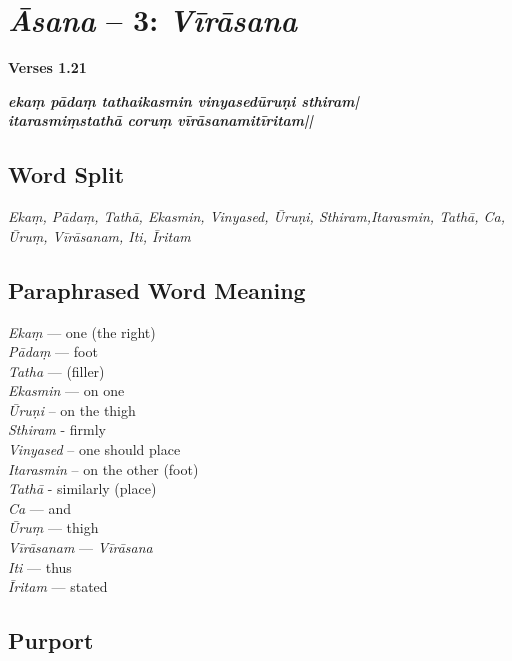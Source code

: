 \section*{\textit{Āsana} -- 3: \textit{Vīrāsana}}

\noindent \textbf{Verses 1.21}

\begin{shloka}
\textit{\textbf{ekaṃ pādaṃ tathaikasmin vinyasedūruṇi sthiram|}\\
\textbf{itarasmiṃstathā coruṃ vīrāsanamitīritam||}}
\end{shloka}

\subsection*{Word Split}

\textit{Ekaṃ, Pādaṃ,  Tathā, Ekasmin, Vinyased, Ūruṇi, Sthiram,Itarasmin, Tathā, Ca, Ūruṃ, Vīrāsanam, Iti, Īritam}

\subsection*{Paraphrased Word Meaning}

\begin{multicols}{2}
\textit{Ekaṃ} --- one (the right)\\
\textit{Pādaṃ} --- foot\\ 
\textit{Tatha} --- (filler)\\  
\textit{Ekasmin} --- on one\\ 
\textit{Ūruṇi} – on the thigh\\ 
\textit{Sthiram} - firmly\\  
\textit{Vinyased} – one should place\\
\textit{Itarasmin} – on the other (foot)\\
\textit{Tathā}  - similarly (place)\\
\textit{Ca} --- and\\
\textit{Ūruṃ} --- thigh\\
\textit{Vīrāsanam} --- \textit{Vīrāsana}\\
\textit{Iti} --- thus\\
\textit{Īritam} --- stated
\end{multicols}

\subsection*{Purport}

